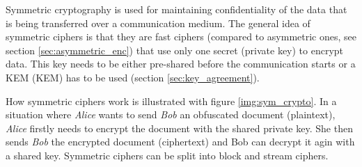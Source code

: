 Symmetric cryptography is used for maintaining confidentiality of the data that is being transferred over a communication medium. The general idea of symmetric ciphers is that they are fast ciphers (compared to asymmetric ones, see section \ref{sec:asymmetric_enc}) that use only one secret (private key) to encrypt data. This key needs to be either pre-shared before the communication starts or a KEM ({\acl{KEM}}) has to be used (section \ref{sec:key_agreement}).

How symmetric ciphers work is illustrated with figure \ref{img:sym_crypto}. In a situation where \textit{Alice} wants to send \textit{Bob} an obfuscated document (plaintext), \textit{Alice} firstly needs to encrypt the document with the shared private key. She then sends \textit{Bob} the encrypted document (ciphertext) and Bob can decrypt it agin with a shared key. Symmetric ciphers can be split into block and stream ciphers.



